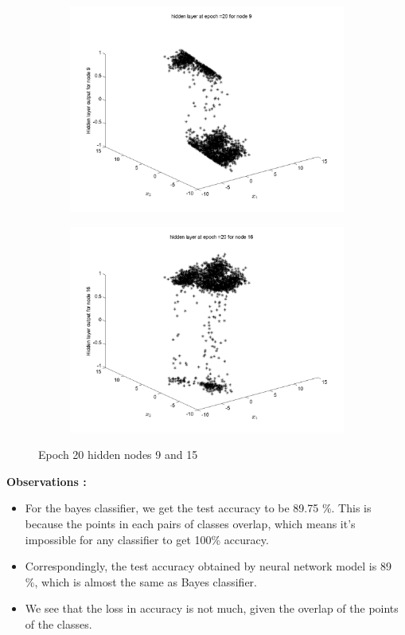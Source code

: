 \documentclass{article}
\begin{document}
\begin{figure}
\begin{subfigure}{.5\textwidth}
  \centering
  \includegraphics[width=.8\linewidth]{Classification/overlapping/h20_9}
 
\end{subfigure}%
\begin{subfigure}{.5\textwidth}
  \centering
  \includegraphics[width=.8\linewidth]{Classification/overlapping/h20_15}
  \end{subfigure}
\caption{Epoch 20 hidden nodes 9 and 15}
\end{figure}

\textbf{Observations :}
\begin{itemize}
\item For the bayes classifier, we get the test accuracy to be 89.75 \%. This is because the points in each pairs of classes overlap, which means it's impossible for any classifier to get 100\% accuracy.
\item Correspondingly, the test accuracy obtained by neural network model is 89 \%, which is almost the same as Bayes classifier.
\item We see that the loss in accuracy is not much, given the overlap of the points of the classes.
\end{itemize}
\end{document}
